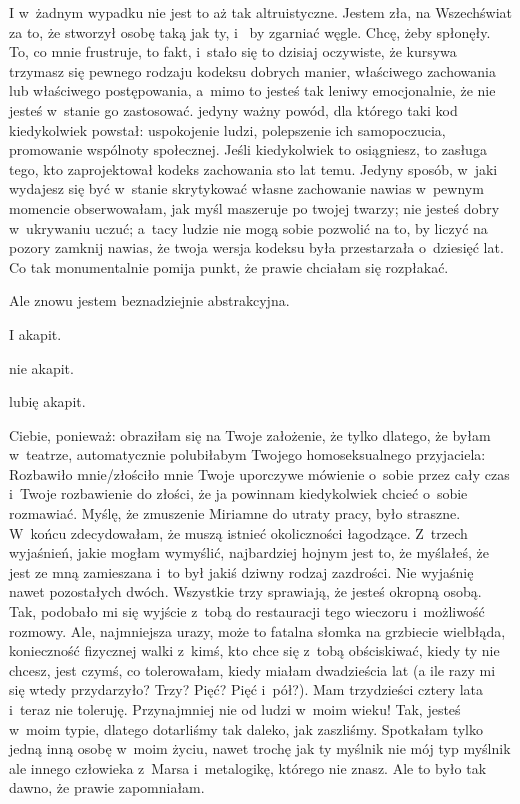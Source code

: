 \documentclass[oneside,polish,11pt,rmheadings]{mwbk}
\begin{document}
I w~żadnym wypadku nie jest to aż tak altruistyczne. Jestem zła, na Wszechświat za to, że stworzył osobę taką jak ty, i~ by zgarniać węgle. Chcę, żeby spłonęły. To, co mnie frustruje, to fakt, i~stało się to dzisiaj oczywiste, że kursywa trzymasz się pewnego rodzaju kodeksu dobrych manier, właściwego zachowania lub właściwego postępowania, a~mimo to jesteś tak leniwy emocjonalnie, że nie jesteś w~stanie go zastosować. jedyny ważny powód, dla którego taki kod kiedykolwiek powstał: uspokojenie ludzi, polepszenie ich samopoczucia, promowanie wspólnoty społecznej. Jeśli kiedykolwiek to osiągniesz, to zasługa tego, kto zaprojektował kodeks zachowania sto lat temu. Jedyny sposób, w~jaki wydajesz się być w~stanie skrytykować własne zachowanie nawias w~pewnym momencie obserwowałam, jak myśl maszeruje po twojej twarzy; nie jesteś dobry w~ukrywaniu uczuć; a~tacy ludzie nie mogą sobie pozwolić na to, by liczyć na pozory zamknij nawias, że twoja wersja kodeksu była przestarzała o~dziesięć lat. Co tak monumentalnie pomija punkt, że prawie chciałam się rozpłakać. 

Ale znowu jestem beznadziejnie abstrakcyjna. 

I akapit. 

nie akapit. 

lubię akapit. 

Ciebie, ponieważ: obraziłam się na Twoje założenie, że tylko dlatego, że byłam w~teatrze, automatycznie polubiłabym Twojego homoseksualnego przyjaciela: Rozbawiło mnie/złościło mnie Twoje uporczywe mówienie o~sobie przez cały czas i~Twoje rozbawienie do złości, że ja powinnam kiedykolwiek chcieć o~sobie rozmawiać. Myślę, że zmuszenie Miriamne do utraty pracy, było straszne. W~końcu zdecydowałam, że muszą istnieć okoliczności łagodzące. Z~trzech wyjaśnień, jakie mogłam wymyślić, najbardziej hojnym jest to, że myślałeś, że jest ze mną zamieszana i~to był jakiś dziwny rodzaj zazdrości. Nie wyjaśnię nawet pozostałych dwóch. Wszystkie trzy sprawiają, że jesteś okropną osobą. Tak, podobało mi się wyjście z~tobą do restauracji tego wieczoru i~możliwość rozmowy. Ale, najmniejsza urazy, może to fatalna słomka na grzbiecie wielbłąda, konieczność fizycznej walki z~kimś, kto chce się z~tobą obściskiwać, kiedy ty nie chcesz, jest czymś, co tolerowałam, kiedy miałam dwadzieścia lat (a ile razy mi się wtedy przydarzyło? Trzy? Pięć? Pięć i~pół?). Mam trzydzieści cztery lata i~teraz nie toleruję. Przynajmniej nie od ludzi w~moim wieku! Tak, jesteś w~moim typie, dlatego dotarliśmy tak daleko, jak zaszliśmy. Spotkałam tylko jedną inną osobę w~moim życiu, nawet trochę jak ty myślnik nie mój typ myślnik ale innego człowieka z~Marsa i~metalogikę, którego nie znasz. Ale to było tak dawno, że prawie zapomniałam. 
\end{document}
